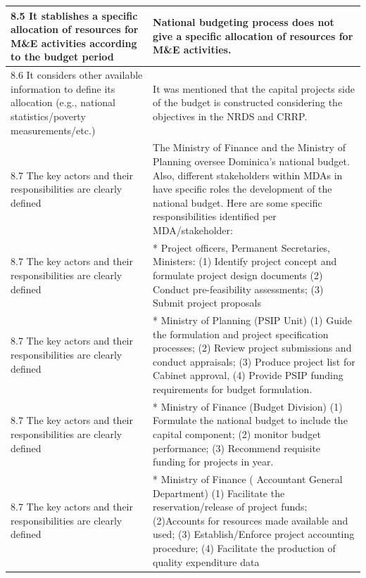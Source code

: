 \documentclass[
  10pt,
]{book}
\begin{document}
\begin{table}
\begin{tabular}[t]{l|l}
\hline
\hspace{1em}8.5 It stablishes a specific allocation of resources for M\&E activities according to the budget period & National budgeting process does not give a specific allocation of resources for M\&E activities.\\
\hline
\hspace{1em}8.6 It considers other available information to define its allocation (e.g., national statistics/poverty measurements/etc.) & It was mentioned that the capital projects side of the budget is constructed considering the objectives in the NRDS and CRRP.\\
\hline
\hspace{1em}8.7 The key actors and their responsibilities are clearly defined & The Ministry of Finance and the Ministry of Planning oversee Dominica’s national budget. Also, different stakeholders within MDAs in have specific roles the development of the national budget. Here are some specific responsibilities identified per MDA/stakeholder:\\
\hline
\hspace{1em}8.7 The key actors and their responsibilities are clearly defined & * Project officers, Permanent Secretaries, Ministers: (1) Identify project concept and formulate project design documents (2) Conduct pre-feasibility assessments; (3) Submit project proposals\\
\hline
\hspace{1em}8.7 The key actors and their responsibilities are clearly defined & * Ministry of Planning (PSIP Unit) (1) Guide the formulation and project specification processes; (2) Review project submissions and conduct appraisals; (3) Produce project list for Cabinet approval, (4) Provide PSIP funding requirements for budget formulation.\\
\hline
\hspace{1em}8.7 The key actors and their responsibilities are clearly defined & * Ministry of Finance (Budget Division) (1) Formulate the national budget to include the capital component; (2) monitor budget performance; (3) Recommend requisite funding for projects in year.\\
\hline
\hspace{1em}8.7 The key actors and their responsibilities are clearly defined & * Ministry of Finance ( Accountant General Department) (1) Facilitate the reservation/release of project funds; (2)Accounts for resources made available and used; (3) Establish/Enforce project accounting procedure; (4) Facilitate the production of quality expenditure data\\
\hline
\end{tabular}
\end{table}
\end{document}
